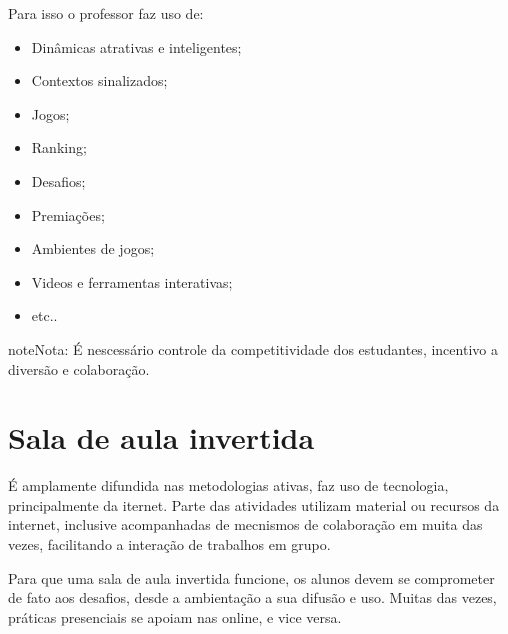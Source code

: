 \documentclass[letterpaper,10pt,brazil]{sphinxmanual}
\begin{document}
Para isso o professor faz uso de:
\begin{itemize}
\item {} 
Dinâmicas atrativas e inteligentes;

\item {} 
Contextos sinalizados;

\item {} 
Jogos;

\item {} 
Ranking;

\item {} 
Desafios;

\item {} 
Premiações;

\item {} 
Ambientes de jogos;

\item {} 
Videos e ferramentas interativas;

\item {} 
etc..

\end{itemize}

\begin{sphinxadmonition}{note}{Nota:}
É nescessário controle da competitividade dos estudantes, incentivo a diversão e colaboração.
\end{sphinxadmonition}


\section{Sala de aula invertida}
\label{\detokenize{metodologias:sala-de-aula-invertida}}
É amplamente difundida nas metodologias ativas, faz uso de tecnologia, principalmente da iternet. Parte das atividades utilizam material ou recursos da internet, inclusive acompanhadas de mecnismos de colaboração em muita das vezes, facilitando a interação de trabalhos em grupo.

Para que uma sala de aula invertida funcione, os alunos devem se comprometer de fato aos desafios, desde a ambientação a sua difusão e uso. Muitas das vezes, práticas presenciais se apoiam nas online, e vice versa.
\end{document}
